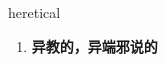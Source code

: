 
\begin{frame}
{\huge heretical}
\begin{center}
\begin{enumerate}\Large
  \item \textbf{异教的，异端邪说的}
\end{enumerate}
\end{center}
\end{frame}
